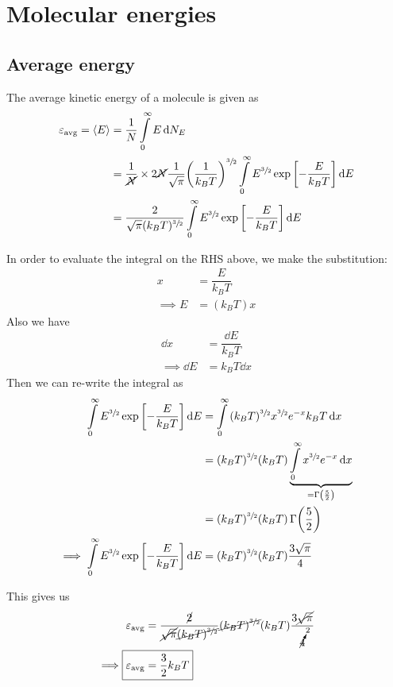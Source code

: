 \section{Molecular energies}

	\subsection{Average energy}
		The average kinetic energy of a molecule is given as
		\begin{align*}
			\varepsilon_\text{avg}=\expval{E}&=\dfrac{1}{N}\int\limits_{0}^{\infty}{E\dd{N_E}} \\
				&=\dfrac{1}{\cancel{N}}\times 2\cancel{N}\dfrac{1}{\sqrt{\pi}}\qty(\dfrac{1}{k_BT})^{\sfrac{3}{2}}\int\limits_{0}^{\infty}{E^{\sfrac{3}{2}}\exp\qty[-\dfrac{E}{k_BT}]\dd{E}} \\
				&=\dfrac{2}{\sqrt{\pi}(k_BT)^{\sfrac{3}{2}}}\int\limits_{0}^{\infty}{E^{\sfrac{3}{2}}\exp\qty[-\dfrac{E}{k_BT}]\dd{E}}
		\end{align*}
		
		In order to evaluate the integral on the RHS above, we make the substitution:
		\begin{align*}
			x&=\dfrac{E}{k_BT} \\
			\implies E&=(k_BT)x
		\end{align*}
		Also we have
		\begin{align*}
			\dd{x}&=\dfrac{\dd{E}}{k_BT} \\
			\implies\dd{E}&=k_BT\dd{x}
		\end{align*}
		Then we can re-write the integral as
		\begin{align*}
			\int\limits_{0}^{\infty}{E^{\sfrac{3}{2}}\exp\qty[-\dfrac{E}{k_BT}]\dd{E}}&=\int\limits_{0}^{\infty}{(k_BT)^{\sfrac{3}{2}}x^{\sfrac{3}{2}}e^{-x}k_BT\dd{x}} \\
				&=(k_BT)^{\sfrac{3}{2}}(k_BT)\underbrace{\int\limits_{0}^{\infty}{x^{\sfrac{3}{2}}e^{-x}\dd{x}}}_{=\Gamma\qty(\frac{5}{2})} \\
				&=(k_BT)^{\sfrac{3}{2}}(k_BT)\,\Gamma\qty(\frac{5}{2}) \\
			\implies\int\limits_{0}^{\infty}{E^{\sfrac{3}{2}}\exp\qty[-\dfrac{E}{k_BT}]\dd{E}}&=(k_BT)^{\sfrac{3}{2}}(k_BT)\dfrac{3\sqrt{\pi}}{4}
		\end{align*}
		
		This gives us
		\begin{align*}
			\varepsilon_\text{avg}&=\dfrac{\cancel{2}}{\cancel{\sqrt{\pi}}\cancel{(k_BT)^{\sfrac{3}{2}}}}\cancel{(k_BT)^{\sfrac{3}{2}}}(k_BT)\dfrac{3\cancel{\sqrt{\pi}}}{\cancelto{2}{4}} \\
			\implies\Aboxed{\varepsilon_\text{avg}&=\dfrac{3}{2}k_BT}
		\end{align*}
		
